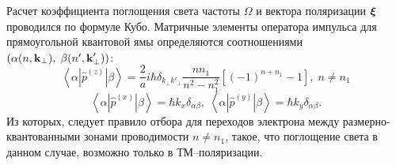 Расчет коэффициента поглощения света частоты $\Omega$ и вектора поляризации $\boldsymbol{\mathbf{\xi}}$ проводился по формуле Кубо.
Матричные элементы оператора импульса  для прямоугольной квантовой ямы определяются соотношениями $(\alpha (n, \boldsymbol{\mathbf{k}}{_\bot}), \; \beta (n', \boldsymbol{\mathbf{k}}'_{\bot}))$:
\begin{equation} \label{eq:syn_04}
\left\langle \alpha \left| \hat{p}^{(z)} \right| \beta \right\rangle = \frac{2}{a} i\hbar \delta_{k_\bot k'_\bot} \frac{n n_1}{n^2 - n_1^2} \left[(-1)^{n+n_1} -1 \right] , \; n \neq n_1
\end{equation}
\begin{equation} \label{eq:syn_05}
\left\langle \alpha \left| \hat{p}^{(x)} \right| \beta \right\rangle = \hbar k_x \delta_{\alpha\beta},\;
\left\langle \alpha \left| \hat{p}^{(y)} \right| \beta \right\rangle = \hbar k_y \delta_{\alpha\beta}.
\end{equation} 
Из которых, следует правило отбора для переходов электрона между размерно-квантованными зонами проводимости $n \neq n_1$, такое, что поглощение света в данном случае, возможно только в ТМ–поляризации.

